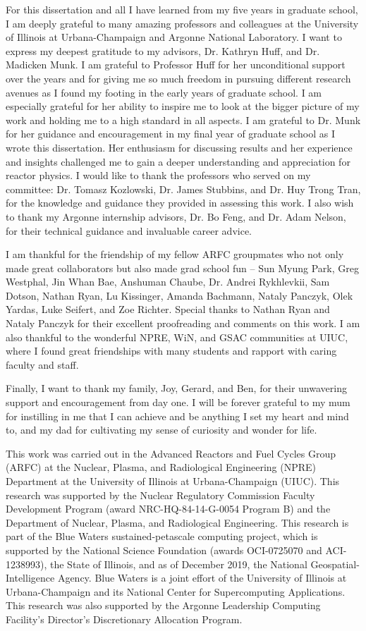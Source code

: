 For this dissertation and all I have learned from my five years in graduate school, 
I am deeply grateful to many amazing professors and colleagues at the University of 
Illinois at Urbana-Champaign and Argonne National Laboratory. 
I want to express my deepest gratitude to my advisors, Dr. Kathryn Huff, and Dr. 
Madicken Munk. 
I am grateful to Professor Huff for her unconditional support over the years and for 
giving me so much freedom in pursuing different research avenues as I found my footing 
in the early years of graduate school. 
I am especially grateful for her ability to inspire me to look at the bigger picture of 
my work and holding me to a high standard in all aspects.
I am grateful to Dr. Munk for her guidance and encouragement in my final year 
of graduate school as I wrote this dissertation. 
Her enthusiasm for discussing results and her experience and insights challenged me to 
gain a deeper understanding and appreciation for reactor physics.  
I would like to thank the professors who served on my committee: Dr. Tomasz 
Kozlowski, Dr. James Stubbins, and Dr. Huy Trong Tran, for the knowledge and guidance 
they provided in assessing this work. 
I also wish to thank my Argonne internship advisors, Dr. Bo Feng, and Dr. Adam Nelson, 
for their technical guidance and invaluable career advice. 

I am thankful for the friendship of my fellow ARFC groupmates who not only made great 
collaborators but also made grad school fun -- Sun Myung Park, Greg Westphal, 
Jin Whan Bae, Anshuman Chaube, Dr. Andrei Rykhlevkii, Sam Dotson, Nathan Ryan, 
Lu Kissinger, Amanda Bachmann, Nataly Panczyk, Olek Yardas, Luke Seifert, and Zoe Richter. 
Special thanks to Nathan Ryan and Nataly Panczyk for their excellent proofreading 
and comments on this work. 
I am also thankful to the wonderful NPRE, WiN, and GSAC communities at UIUC, where 
I found great friendships with many students and rapport with caring faculty and staff. 

Finally, I want to thank my family, Joy, Gerard, and Ben, for their unwavering support 
and encouragement from day one. 
I will be forever grateful to my mum for instilling in me that I can achieve and be 
anything I set my heart and mind to, and my dad for cultivating my sense of curiosity 
and wonder for life.

This work was carried out in the Advanced Reactors and Fuel Cycles Group (ARFC) at the 
Nuclear, Plasma, and Radiological Engineering (NPRE) Department at the University of 
Illinois at Urbana-Champaign (UIUC). 
This research was supported by the Nuclear Regulatory Commission Faculty Development 
Program (award NRC-HQ-84-14-G-0054 Program B) and the Department of Nuclear, Plasma, 
and Radiological Engineering.
This research is part of the Blue Waters sustained-petascale computing project, 
which is supported by the National Science Foundation (awards OCI-0725070 and 
ACI-1238993), the State of Illinois, and as of December 2019, the National 
Geospatial-Intelligence Agency. 
Blue Waters is a joint effort of the University of Illinois at Urbana-Champaign and 
its National Center for Supercomputing Applications.
This research was also supported by the Argonne Leadership Computing Facility's 
Director's Discretionary Allocation Program. 